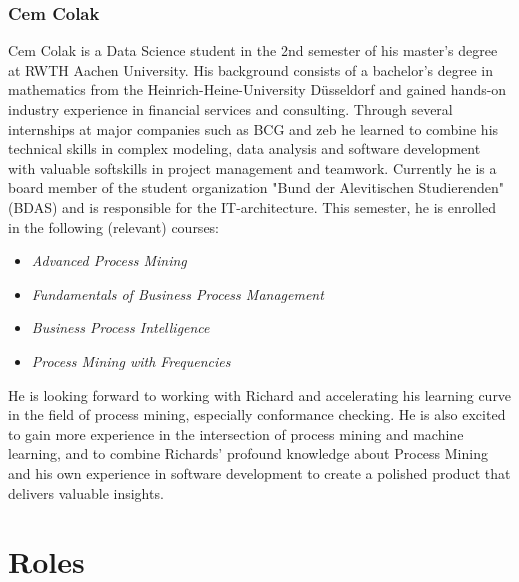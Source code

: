 \documentclass[12pt,a4paper]{article}
\begin{document}
\subsubsection{Cem Colak}
Cem Colak is a Data Science student in the 2nd semester of his master's degree at RWTH Aachen University. His background consists of a bachelor's degree in mathematics from the Heinrich-Heine-University Düsseldorf and gained hands-on industry experience in financial services and consulting. Through several internships at major companies such as BCG and zeb he learned to combine his technical skills in complex modeling, data analysis and software development with valuable softskills in project management and teamwork. Currently he is a board member of the student organization "Bund der Alevitischen Studierenden" (BDAS) and is responsible for the IT-architecture. This semester, he is enrolled in the following (relevant) courses: 
\begin{itemize} 
	\item \textit{Advanced Process Mining}
	\item \textit{Fundamentals of Business Process Management}
	\item \textit{Business Process Intelligence}
	\item \textit{Process Mining with Frequencies}
\end{itemize}
He is looking forward to working with Richard and accelerating his learning curve in the field of process mining, especially conformance checking. He is also excited to gain more experience in the intersection of process mining and machine learning, and to combine Richards' profound knowledge about Process Mining and his own experience in software development to create a polished product that delivers valuable insights.
\section{Roles}
\end{document}
